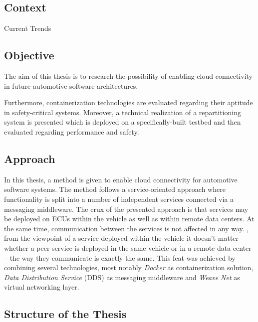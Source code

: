 \subsection{Context}
Current Trends


%
%
%
%
%
%
%
%
%
%

\subsection{Objective}

The aim of this thesis is to research the possibility of enabling cloud connectivity in future automotive software architectures.
 
Furthermore, containerization technologies are evaluated regarding their aptitude in safety-critical systems. Moreover, a technical realization of a repartitioning system is presented which is deployed on a specifically-built testbed and then evaluated regarding performance and safety.

%
%
%
%
%
%
%
%
%
%

\subsection{Approach}

In this thesis, a method is given to enable cloud connectivity for automotive software systems. 
The method follows a service-oriented approach where functionality is split into a number of independent services connected via a messaging middleware. 
The crux of the presented approach is that services may be deployed on ECUs within the vehicle as well as within remote data centers. At the same time, communication between the services is not affected in any way. \Ie , from the viewpoint of a service deployed within the vehicle it doesn't matter whether a peer service is deployed in the same vehicle or in a remote data center -- the way they communicate is exactly the same.
This feat was achieved by combining several technologies, most notably \emph{Docker}\cite{DockerWebsite} as containerization solution, \emph{Data Distribution Service} (DDS) as messaging middleware and \emph{Weave Net}\cite{WeavenetWebsite} as virtual networking layer.

%
%
%
%
%
%
%
%
%
%

\subsection{Structure of the Thesis}

